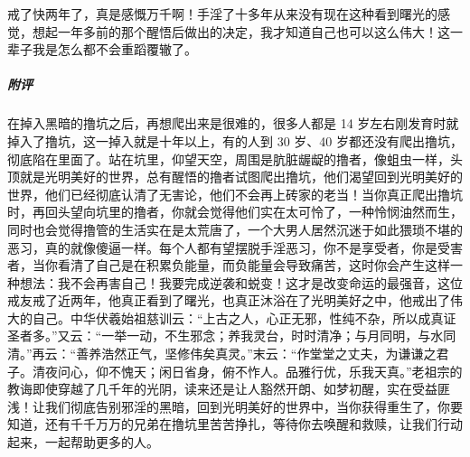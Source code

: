 \begin{case}
    戒了快两年了，真是感慨万千啊！手淫了十多年从来没有现在这种看到曙光的感觉，想起一年多前的那个醒悟后做出的决定，我才知道自己也可以这么伟大！这一辈子我是怎么都不会重蹈覆辙了。
    \subparagraph{附评} 在掉入黑暗的撸坑之后，再想爬出来是很难的，很多人都是 14 岁左右刚发育时就掉入了撸坑，这一掉入就是十年以上，有的人到 30 岁、40 岁都还没有爬出撸坑，彻底陷在里面了。站在坑里，仰望天空，周围是肮脏龌龊的撸者，像蛆虫一样，头顶就是光明美好的世界，总有醒悟的撸者试图爬出撸坑，他们渴望回到光明美好的世界，他们已经彻底认清了无害论，他们不会再上砖家的老当！当你真正爬出撸坑时，再回头望向坑里的撸者，你就会觉得他们实在太可怜了，一种怜悯油然而生，同时也会觉得撸管的生活实在是太荒唐了，一个大男人居然沉迷于如此猥琐不堪的恶习，真的就像傻逼一样。每个人都有望摆脱手淫恶习，你不是享受者，你是受害者，当你看清了自己是在积累负能量，而负能量会导致痛苦，这时你会产生这样一种想法：我不会再害自己！我要完成逆袭和蜕变！这才是改变命运的最强音，这位戒友戒了近两年，他真正看到了曙光，也真正沐浴在了光明美好之中，他戒出了伟大的自己。中华伏羲始祖慈训云：“上古之人，心正无邪，性纯不杂，所以成真证圣者多。”又云：“一举一动，不生邪念；养我灵台，时时清净；与月同明，与水同清。”再云：“善养浩然正气，坚修伟矣真灵。”末云：“作堂堂之丈夫，为谦谦之君子。清夜问心，仰不愧天；闲日省身，俯不怍人。品雅行优，乐我天真。”老祖宗的教诲即使穿越了几千年的光阴，读来还是让人豁然开朗、如梦初醒，实在受益匪浅！让我们彻底告别邪淫的黑暗，回到光明美好的世界中，当你获得重生了，你要知道，还有千千万万的兄弟在撸坑里苦苦挣扎，等待你去唤醒和救赎，让我们行动起来，一起帮助更多的人。
\end{case}

